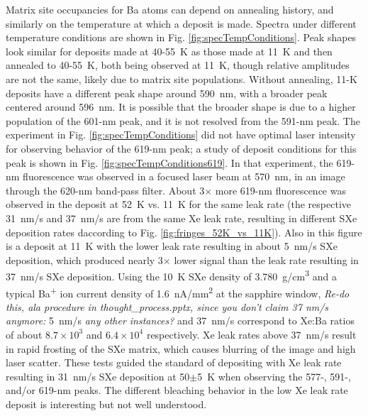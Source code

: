 Matrix site occupancies for Ba atoms can depend on annealing history, and similarly on the temperature at which a deposit is made.  Spectra under different temperature conditions are shown in Fig. \ref{fig:specTempConditions}.  Peak shapes look similar for deposits made at 40-55~K as those made at 11~K and then annealed to 40-55~K, both being observed at 11~K, though relative amplitudes are not the same, likely due to matrix site populations.  Without annealing, 11-K deposits have a different peak shape around 590~nm, with a broader peak centered around 596~nm.  It is possible that the broader shape is due to a higher population of the 601-nm peak, and it is not resolved from the 591-nm peak.  The experiment in Fig. \ref{fig:specTempConditions} did not have optimal laser intensity for observing behavior of the 619-nm peak; a study of deposit conditions for this peak is shown in Fig. \ref{fig:specTempConditions619}.  In that experiment, the 619-nm fluorescence was observed in a focused laser beam at 570~nm, in an image through the 620-nm band-pass filter.  About 3$\times$ more 619-nm fluorescence was observed in the deposit at 52~K vs. 11~K for the same leak rate (the respective 31~nm/s and 37~nm/s are from the same Xe leak rate, resulting in different SXe deposition rates daccording to Fig. \ref{fig:fringes_52K_vs_11K}).  Also in this figure is a deposit at 11~K with the lower leak rate resulting in about 5~nm/s SXe deposition, which produced nearly 3$\times$ lower signal than the leak rate resulting in 37~nm/s SXe deposition.  Using the 10~K SXe density of 3.780~g/cm\textsuperscript{3} \cite{SXeDensity} and a typical Ba\textsuperscript{+} ion current density of 1.6~nA/mm\textsuperscript{2} at the sapphire window, \emph{\color{gray}Re-do this, ala procedure in thought\_process.pptx, since you don't claim 37 nm/s anymore:} 5~nm/s \emph{\color{gray}any other instances?} and 37~nm/s correspond to Xe:Ba ratios of about $8.7 \times 10^{3}$ and $6.4 \times 10^{4}$ respectively.  Xe leak rates above 37~nm/s result in rapid frosting of the SXe matrix, which causes blurring of the image and high laser scatter.  These tests guided the standard of depositing with Xe leak rate resulting in 31~nm/s SXe deposition at 50$\pm$5~K when observing the 577-, 591-, and/or 619-nm peaks.  The different bleaching behavior in the low Xe leak rate deposit is interesting but not well understood.



